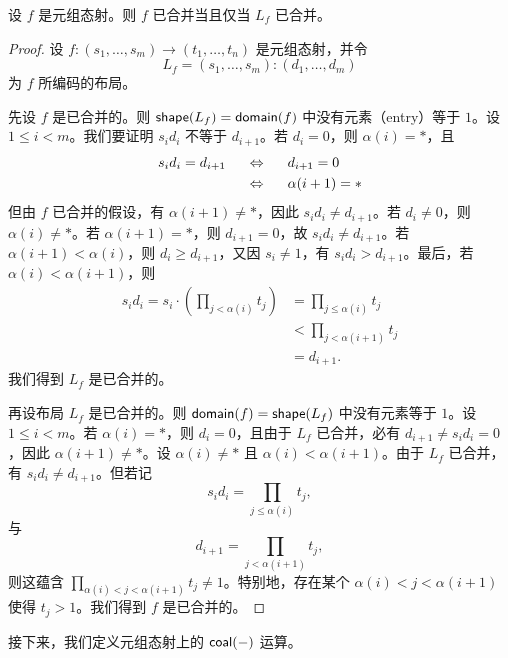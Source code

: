 \begin{proposition}\label{coalescedmorphismcoalescedlayoutproposition}
    设 $f$ 是元组态射。则 $f$ 已合并当且仅当 $L_f$ 已合并。 
\end{proposition}
\begin{proof} 设 $f:(s_1,\dots,s_m) \to (t_1,\dots,t_n)$ 是元组态射，并令
\[L_f = (s_1,\dots,s_m):(d_1,\dots,d_m)\]
为 $f$ 所编码的布局。 

先设 $f$ 是已合并的。则 $\mathsf{shape}(L_f) = \mathsf{domain}(f)$ 中没有元素（entry）等于 $1$。设 $1 \leq i < m$。我们要证明 $s_id_i$ 不等于 $d_{i+1}$。若 $d_i = 0$，则 $\alpha(i) = *$，且
\begin{align*}
    s_id_i = d_{i+1} & \hspace{0.2in} \Leftrightarrow \hspace{0.2in} d_{i+1} = 0\\
    & \hspace{0.2in} \Leftrightarrow \hspace{0.2in} \alpha(i+1) = *
\end{align*}
但由 $f$ 已合并的假设，有 $\alpha(i+1) \neq *$，因此 $s_id_i \neq d_{i+1}$。若 $d_i \neq 0$，则 $\alpha(i) \neq *$。若 $\alpha(i+1) = *$，则 $d_{i+1} = 0$，故 $s_id_i \neq d_{i+1}$。若 $\alpha(i+1) < \alpha(i)$，则 $d_i \geq d_{i+1}$，又因 $s_i \neq 1$，有 $s_id_i > d_{i+1}$。最后，若 $\alpha(i) < \alpha(i+1)$，则
\begin{align*}
s_id_i = s_i \cdot \left( \prod_{j< \alpha(i)} t_j\right) & = \prod_{j \leq \alpha(i)} t_j \\
& < \prod_{j < \alpha(i+1)} t_j\\
& = d_{i+1}.
\end{align*}
我们得到 $L_f$ 是已合并的。 

再设布局 $L_f$ 是已合并的。则 $\mathsf{domain}(f) = \mathsf{shape}(L_f)$ 中没有元素等于 $1$。设 $1 \leq i < m$。若 $\alpha(i) = *$，则 $d_i = 0$，且由于 $L_f$ 已合并，必有 $d_{i+1} \neq s_id_i = 0$，因此 $\alpha(i+1) \neq *$。设 $\alpha(i) \neq *$ 且 $\alpha(i)<\alpha(i+1)$。由于 $L_f$ 已合并，有 $s_id_i \neq d_{i+1}$。但若记  
\[
s_i d_i = \prod_{j \leq \alpha(i)} t_j,
\]
与
\[
d_{i+1} = \prod_{j<\alpha(i+1)} t_j,
\]
则这蕴含 $\prod_{\alpha(i) < j < \alpha(i+1)}t_j \neq 1$。特别地，存在某个 $\alpha(i)<j<\alpha(i+1)$ 使得 $t_j >1$。我们得到 $f$ 是已合并的。 
\end{proof}

接下来，我们定义元组态射上的 $\mathsf{coal}(-)$ 运算。


